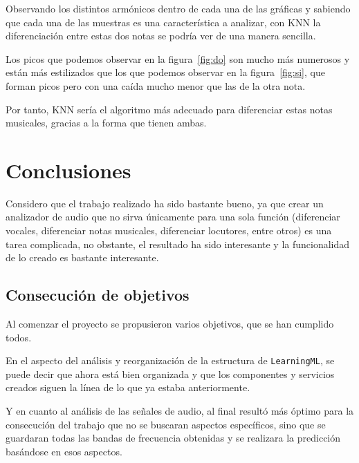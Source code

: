 \documentclass[a4paper, 12pt]{book}
\begin{document}
Observando los distintos armónicos dentro de cada una de las gráficas y sabiendo que cada una de las muestras es una característica a analizar, con KNN la diferenciación entre estas dos notas se podría ver de una manera sencilla.

Los picos que podemos observar en la figura~\ref{fig:do} son mucho más numerosos y están más estilizados que los que podemos observar en la figura~\ref{fig:si}, que forman picos pero con una caída mucho menor que las de la otra nota.

Por tanto, KNN sería el algoritmo más adecuado para diferenciar estas notas musicales, gracias a la forma que tienen ambas.



\cleardoublepage
\chapter{Conclusiones}
\label{chap:conclusiones}

Considero que el trabajo realizado ha sido bastante bueno, ya que crear un analizador de audio que no sirva únicamente para una sola función (diferenciar vocales, diferenciar notas musicales, diferenciar locutores, entre otros) es una tarea complicada, no obstante, el resultado ha sido interesante y la funcionalidad de lo creado es bastante interesante.

\section{Consecución de objetivos}
\label{sec:consecucion-objetivos}

Al comenzar el proyecto se propusieron varios objetivos, que se han cumplido todos.

En el aspecto del análisis y reorganización de la estructura de \texttt{LearningML}, se puede decir que ahora está bien organizada y que los componentes y servicios creados siguen la línea de lo que ya estaba anteriormente.

Y en cuanto al análisis de las señales de audio, al final resultó más óptimo para la consecución del trabajo que no se buscaran aspectos específicos, sino que se guardaran todas las bandas de frecuencia obtenidas y se realizara la predicción basándose en esos aspectos.
\end{document}

